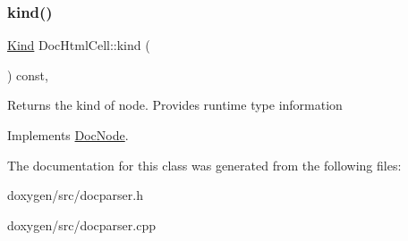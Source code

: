 \subsubsection{\texorpdfstring{kind()}{kind()}}
{\footnotesize\ttfamily \mbox{\hyperlink{class_doc_node_aebd16e89ca590d84cbd40543ea5faadb}{Kind}} Doc\+Html\+Cell\+::kind (\begin{DoxyParamCaption}{ }\end{DoxyParamCaption}) const\hspace{0.3cm}{\ttfamily [inline]}, {\ttfamily [virtual]}}

Returns the kind of node. Provides runtime type information 

Implements \mbox{\hyperlink{class_doc_node_a108ffd214a72ba6e93dac084a8f58049}{Doc\+Node}}.



The documentation for this class was generated from the following files\+:\begin{DoxyCompactItemize}
\item 
doxygen/src/docparser.\+h\item 
doxygen/src/docparser.\+cpp\end{DoxyCompactItemize}
